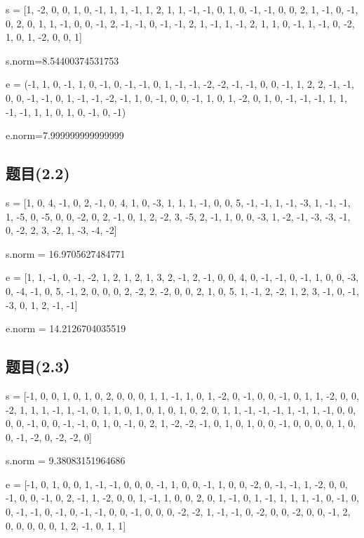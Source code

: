 \documentclass[12pt,a4paper]{article}
\numberwithin{equation}{section}
\begin{document}
s = [1, -2, 0, 0, 1, 0, -1, 1, 1, -1, 1, 2, 1, 1,
-1, -1, 0, 1, 0, -1, -1, 0, 0, 2, 1, -1, 0, -1, 0, 2, 0, 1,
1, -1, 0, 0, -1, 2, -1, -1, 0, -1, -1, 2, 1, -1, 1, -1, 2, 1, 1, 0,
-1, 1, -1, 0, -2, 1, 0, 1, -2, 0, 0, 1]

s.norm=8.54400374531753

\hspace*{\fill}

e = (-1, 1, 0, -1, 1, 0, -1, 0, -1, -1, 0, 1, -1, -1, -2, -2, -1, -1, 0, 0, -1, 1, 2, 2, -1,
-1, 0, 0, -1, -1, 0, 1, -1, -1, -2, -1, 1, 0, -1, 0, 0, -1, 1, 0, 1, -2, 0, 1, 0, -1, -1,
-1, 1, 1, -1, -1, 1, 1, 0, 1, 0, -1, 0, -1)

e.norm=7.999999999999999

\subsection{题目(2.2)}

s = [1, 0, 4, -1, 0, 2, -1, 0, 4, 1, 0, -3, 1, 1, 1, -1, 0, 0, 5, -1, -1, 1, -1, -3, 1, -1, -1, 1, -5, 0, -5, 0, 0, -2, 0, 2, -1, 0, 1, 2, -2, 3, -5, 2, -1, 1, 0, 0, -3, 1, -2, -1, -3, -3, -1, 0, -2, 2, 3, -2, 1, -3, -4, -2]

s.norm = 16.9705627484771

e = [1, 1, -1, 0, -1, -2, 1, 2, 1, 2, 1, 3, 2, -1, 2, -1, 0, 0, 4, 0, -1, -1, 0, -1, 1, 0, 0, -3, 0, -4, -1, 0, 5, -1, 2, 0, 0, 0, 2, -2, 2, -2, 0, 0, 2, 1, 0, 5, 1, -1, 2, -2, 1, 2, 3, -1, 0, -1, -3, 0, 1, 2, -1, -1]

e.norm = 14.2126704035519

\subsection{题目(2.3）}

s = [-1, 0, 0, 1, 0, 1, 0, 2, 0, 0, 0, 1, 1, -1, 1, 0, 1, -2, 0, -1, 0, 0, -1, 0, 1, 1, -2, 0, 0, -2, 1, 1, 1, -1, 1, -1, 0, 1, 1, 0, 1, 0, 1, 0, 1, 0, 2, 0, 1, 1, -1, -1, -1, 1, -1, 1, -1, 0, 0, 0, 0, -1, 0, 0, -1, -1, 0, 1, 0, -1, 0, 2, 1, -2, -2, -1, 0, 1, 0, 1, 0, 0, -1, 0, 0, 0, 0, 1, 0, 0, -1, -2, 0, -2, -2, 0]

s.norm = 9.38083151964686

\hspace*{\fill}

e = [-1, 0, 1, 0, 0, 1, -1, -1, 0, 0, 0, -1, 1, 0, 0, -1, 1, 0, 0, -2, 0, -1, -1, 1, -2, 0, 0, -1, 0, 0, -1, 0, 2, -1, 1, -2, 0, 0, 1, -1, 1, 0, 0, 2, 0, 1, -1, 0, 1, -1, 1, 1, 1, -1, 0, -1, 0, 0, -1, -1, 0, -1, 0, -1, -1, 0, 0, -1, 0, 0, 0, -2, -2, 1, -1, -1, 0, -2, 0, 0, -2, 0, 0, -1, 2, 0, 0, 0, 0, 0, 1, 2, -1, 0, 1, 1]
\end{document}
